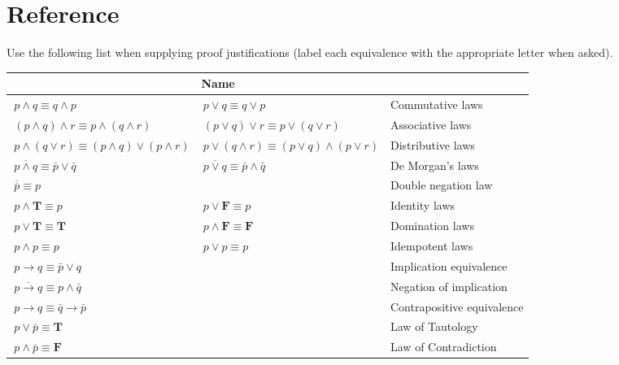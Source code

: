 \newpage



\section*{Reference}

Use the following list when supplying proof justifications (label each equivalence with the appropriate letter when asked).
\begin{table}[h!]
\centering
\renewcommand{\arraystretch}{1.2}
\setlength{\tabcolsep}{8pt}
\begin{tabular}{|p{5.0cm}|p{5.0cm}|p{5.2cm}|}
\hline
\rowcolor[HTML]{E0E0E0}
\multicolumn{2}{|l|}{\textbf{Expression}} & \textbf{Name} \\
\hline
$\,p \wedge q \equiv q \wedge p$ & $\,p \vee q \equiv q \vee p$ & Commutative laws \\
\hline
$\, (p \wedge q) \wedge r \equiv p \wedge (q \wedge r)$ & $\, (p \vee q) \vee r \equiv p \vee (q \vee r)$ & Associative laws \\
\hline
$\,p \wedge (q \vee r) \equiv (p \wedge q) \vee (p \wedge r)$ & $\,p \vee (q \wedge r) \equiv (p \vee q) \wedge (p \vee r)$ & Distributive laws \\
\hline
$\,\overline{p \wedge q} \equiv \bar{p} \vee \bar{q}$ & $\,\overline{p \vee q} \equiv \bar{p} \wedge \bar{q}$ & De Morgan's laws \\
\hline
\multicolumn{2}{|l|}{$\,\overline{\overline{p}} \equiv p$} & Double negation law \\
\hline
$\,p \wedge \boldsymbol{T} \equiv p$ & $\,p \vee \boldsymbol{F} \equiv p$ & Identity laws \\
\hline
$\,p \vee \boldsymbol{T} \equiv \boldsymbol{T}$ & $\,p \wedge \boldsymbol{F} \equiv \boldsymbol{F}$ & Domination laws \\
\hline
$\,p \wedge p \equiv p$ & $\,p \vee p \equiv p$ & Idempotent laws \\
\hline
\multicolumn{2}{|l|}{$\,p \rightarrow q \equiv \bar{p} \vee q$} & Implication equivalence \\
\hline
\multicolumn{2}{|l|}{$\,\overline{p \rightarrow q} \equiv p \wedge \bar{q}$} & Negation of implication \\
\hline
\multicolumn{2}{|l|}{$\,p \rightarrow q \equiv \bar{q} \rightarrow \bar{p}$} & Contrapositive equivalence \\
\hline
\multicolumn{2}{|l|}{$\,p \vee \bar{p} \equiv \boldsymbol{T}$} & Law of Tautology \\
\hline
\multicolumn{2}{|l|}{$\,p \wedge \bar{p} \equiv \boldsymbol{F}$} & Law of Contradiction \\
\hline
\end{tabular}
\end{table}

